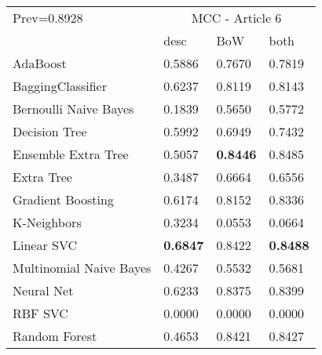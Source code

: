 \begin{tabular}{|l|l|l|l| }
\hline
Prev=0.8928 &  \multicolumn{3}{c|}{MCC - Article 6} \\
\cline{2-4} & desc & BoW & both \\ \hline
AdaBoost                & 0.5886 & 0.7670 & 0.7819\\
BaggingClassifier       & 0.6237 & 0.8119 & 0.8143\\
Bernoulli Naive Bayes   & 0.1839 & 0.5650 & 0.5772\\
Decision Tree           & 0.5992 & 0.6949 & 0.7432\\
Ensemble Extra Tree     & 0.5057 & {\bf 0.8446} & 0.8485\\
Extra Tree              & 0.3487 & 0.6664 & 0.6556\\
Gradient Boosting       & 0.6174 & 0.8152 & 0.8336\\
K-Neighbors             & 0.3234 & 0.0553 & 0.0664\\
Linear SVC              & {\bf 0.6847} & 0.8422 & {\bf 0.8488}\\
Multinomial Naive Bayes & 0.4267 & 0.5532 & 0.5681\\
Neural Net              & 0.6233 & 0.8375 & 0.8399\\
RBF SVC                 & 0.0000 & 0.0000 & 0.0000\\
Random Forest           & 0.4653 & 0.8421 & 0.8427\\
\hline
\end{tabular}
